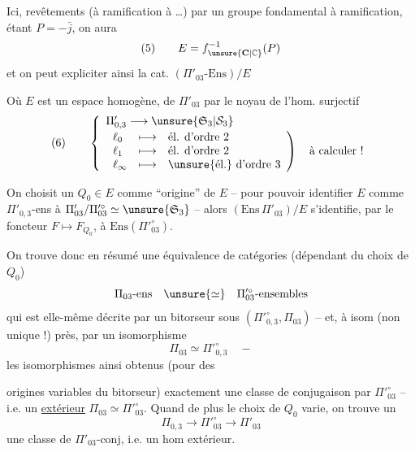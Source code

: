 Ici,   revêtements  (à ramification  à \dots) par un groupe fondamental à ramification, étant  $P=-\bar j$, on aura
\[
(5)\qquad E=f_{\unsure{\mathbf C|\mathbb C}}^{-1}(P)
\]
et on peut expliciter ainsi la cat. $(\Pi'_{03}\text{-Ens})/E$\unsure{;}

Où $E$ est un espace homogène,   de $\Pi'_{03}$ par le   noyau de l'hom. surjectif 
\[
(6)\qquad
\left\{
\begin{array}{l}
\Pi'_{0,3}\longrightarrow\unsure{\mathfrak S_3|\mathcal S_3}\\[2pt]
\left.
\begin{array}{lll}
\ell_0 &\longmapsto& \text{él. d'ordre 2}\\
\ell_1 &\longmapsto& \text{él. d'ordre 2}\\
\ell_\infty &\longmapsto& \text{\unsure{él.} d'ordre 3}
\end{array}
\right)\quad\text{à calculer !}
\end{array}
\right.
\]

On choisit un $Q_0\in E$ comme ``origine'' de $E$ -- pour pouvoir identifier $E$ comme $\Pi'_{0,3}$-ens à $\Pi'_{03}/\Pi'^{\circ}_{03}\simeq\unsure{\mathfrak S_3}$ -- alors $(\mathrm{Ens}\,\Pi'_{03})/E$ s'identifie, par le foncteur $F\longmapsto F_{Q_0}$, à $\mathrm{Ens}(\Pi'^{\circ}_{03})$.

On trouve donc en résumé une équivalence de catégories (dépendant du choix de $Q_0$)
\[
\Pi_{03}\text{-ens}\quad\unsure{\simeq}\quad\Pi'^{\circ}_{03}\text{-ensembles}
\]
qui est elle-même décrite par un bitorseur sous $(\Pi'^{\circ}_{0,3},\Pi_{03})$ -- et, à isom  (non unique !) près, par un isomorphisme
\[
\Pi_{03}\simeq\Pi'^{\circ}_{0,3}\quad -
\]
les isomorphismes ainsi obtenus (pour des

origines variables du bitorseur)  exactement une classe de conjugaison par $\Pi'^{\circ}_{03}$ -- i.e. un \uline{} \uline{extérieur} $\Pi_{03}\simeq\Pi'^{\circ}_{03}$. Quand de plus le choix de $Q_0$ varie, on trouve  un 
\[
\Pi_{0,3}\longrightarrow\Pi'^{\circ}_{03}\longrightarrow\Pi'_{03}
\]
 une classe de $\Pi'_{03}$-conj, i.e. un hom extérieur.

